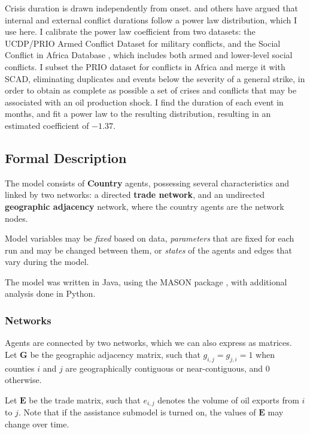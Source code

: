 \documentclass{article}
\begin{document}
Crisis duration is drawn independently from onset. \citet{cioffi_2004} and others have argued that internal and external conflict durations follow a power law distribution, which I use here. I calibrate the power law coefficient from two datasets: the UCDP/PRIO Armed Conflict Dataset \citep{lotta_2013} for military conflicts, and the Social Conflict in Africa Database \citep{hendrix_2013}, which includes both armed and lower-level social conflicts. I subset the PRIO dataset for conflicts in Africa and merge it with SCAD, eliminating duplicates and events below the severity of a general strike, in order to obtain as complete as possible a set of crises and conflicts that may be associated with an oil production  shock. I find the duration of each event in months, and fit a power law to the resulting distribution, resulting in an estimated coefficient of $\mathbf{-1.37}$.

\subsection{Formal Description}

The model consists of \textbf{Country} agents, possessing several characteristics and linked by two networks: a directed \textbf{trade network}, and an undirected \textbf{geographic adjacency} network, where the country agents are the network nodes.

Model variables may be \emph{fixed} based on data, \emph{parameters} that are fixed for each run and may be changed between them, or \emph{states} of the agents and edges that vary during the model.

The model was written in Java, using the MASON package \citep{luke_2005}, with additional analysis done in Python. 

\subsubsection{Networks}

Agents are connected by two networks, which we can also express as matrices. Let $\mathbf{G}$ be the geographic adjacency matrix, such that $g_{i,j}=g_{j,i}=1$ when counties $i$ and $j$ are geographically contiguous or near-contiguous, and $0$ otherwise. 

Let $\mathbf{E}$ be the trade matrix, such that $e_{i,j}$ denotes the volume of oil exports from $i$ to $j$. Note that if the assistance submodel is turned on, the values of $\mathbf{E}$ may change over time.
\end{document}
